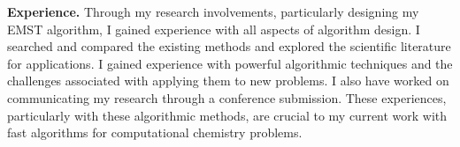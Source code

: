\documentclass[twoside,leqno, 12pt]{article}
\begin{document}
\textbf{Experience.}  Through my research involvements, particularly designing my EMST algorithm, I 
gained experience with all aspects of algorithm design.  I searched and compared the existing methods and explored the scientific literature for applications.  I gained experience with powerful algorithmic techniques and the challenges associated with applying them to new problems.  I also have worked on communicating my research through a conference submission.  These experiences, particularly with these algorithmic methods, are crucial to my current work with fast algorithms for computational chemistry problems.







\end{document}
